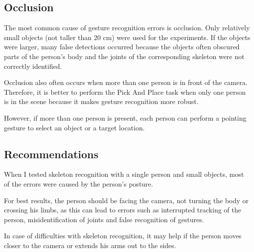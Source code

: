\subsection{Occlusion}
The most common cause of gesture recognition errors is occlusion. Only relatively small objects (not taller than 20 cm) were used for the experiments. If the objects were larger, many false detections occurred because the objects often obscured parts of the person's body and the joints of the corresponding skeleton were not correctly identified.\par
Occlusion also often occurs when more than one person is in front of the camera. Therefore, it is better to perform the Pick And Place task when only one person is in the scene because it makes gesture recognition more robust.\par
However, if more than one person is present, each person can perform a pointing gesture to select an object or a target location.\par

\subsection{Recommendations}
When I tested skeleton recognition with a single person and small objects, most of the errors were caused by the person's posture.\par
For best results, the person should be facing the camera, not turning the body or crossing his limbs, as this can lead to errors such as interrupted tracking of the person, misidentification of joints and false recognition of gestures.\par
In case of difficulties with skeleton recognition, it may help if the person moves closer to the camera or extends his arms out to the sides.\par